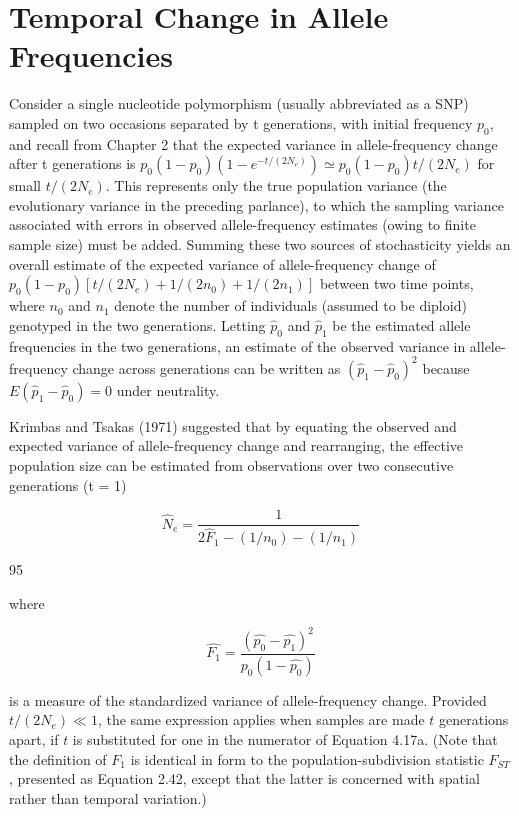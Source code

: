 \documentclass{article}
\begin{document}
\section{Temporal Change in Allele Frequencies}
Consider a single nucleotide polymorphism (usually abbreviated as a SNP) sampled on two occasions separated by t generations, with initial frequency  $ p_0 $, and recall from Chapter 2 that the expected variance in allele-frequency change after t generations is  $ p_0(1 - p_0)(1 - e^{-t/(2N_e)}) \simeq p_0(1 - p_0)t/(2N_e) $ for small  $ t/(2N_e) $. This represents only the true population variance (the evolutionary variance in the preceding parlance), to which the sampling variance associated with errors in observed allele-frequency estimates (owing to finite sample size) must be added. Summing these two sources of stochasticity yields an overall estimate of the expected variance of allele-frequency change of  $ p_0(1 - p_0)[t/(2N_e) + 1/(2n_0) + 1/(2n_1)] $ between two time points, where  $ n_0 $ and  $ n_1 $ denote the number of individuals (assumed to be diploid) genotyped in the two generations. Letting  $ \widehat{p}_0 $ and  $ \widehat{p}_1 $ be the estimated allele frequencies in the two generations, an estimate of the observed variance in allele-frequency change across generations can be written as  $ (\widehat{p}_1 - \widehat{p}_0)^2 $ because  $ E(\widehat{p}_1 - \widehat{p}_0) = 0 $ under neutrality.

Krimbas and Tsakas (1971) suggested that by equating the observed and expected variance of allele-frequency change and rearranging, the effective population size can be estimated from observations over two consecutive generations (t = 1)

\begin{equation}
\widehat{N}_{e}=\frac{1}{2\widehat{F}_{1}-\left(1/n_{0}\right)-\left(1/n_{1}\right)}
\tag{4.17a}
\label{eq:4_17a}
\end{equation}

95

where

\begin{equation}
\widehat{F_{1}}=\frac{(\widehat{p_{0}}-\widehat{p_{1}})^{2}}{\widehat{p_{0}}(1-\widehat{p_{0}})}
\tag{4.17b}
\label{eq:4_17b}
\end{equation}

is a measure of the standardized variance of allele-frequency change. Provided  $ t/(2N_e) \ll 1 $, the same expression applies when samples are made  $ t $ generations apart, if  $ t $ is substituted for one in the numerator of Equation 4.17a. (Note that the definition of  $ F_1 $ is identical in form to the population-subdivision statistic  $ F_{ST} $, presented as Equation 2.42, except that the latter is concerned with spatial rather than temporal variation.)
\end{document}
